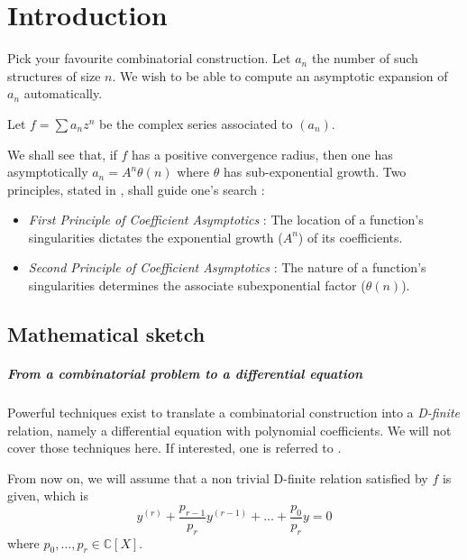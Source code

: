 \documentclass[../main.tex]{subfiles}
\begin{document}
\chapter{Introduction}


Pick your favourite combinatorial construction. Let $a_n$ the number of such structures of size $n$. We wish to be able to compute an asymptotic expansion of $a_n$ automatically.

Let $f = \sum a_n z^n$ be the complex series associated to $(a_n)$.

We shall see that, if $f$ has a positive convergence radius, then one has asymptotically $a_n = A^n \theta(n)$ where $\theta$ has sub-exponential growth.
Two principles, stated in \cite{Flajolet2009}, shall guide one's search :

\begin{itemize}
	\item	\emph{First Principle of Coefficient Asymptotics} : The location of a function’s
			singularities dictates the exponential growth ($A^n$) of its coefficients.
	
	\item	\emph{Second Principle of Coefficient Asymptotics} : The nature of a function’s
			singularities determines the associate subexponential factor ($\theta(n)$).
	
\end{itemize}

\section{Mathematical sketch}

\paragraph{From a combinatorial problem to a differential equation}
Powerful techniques exist to translate a combinatorial construction into a \emph{D-finite} relation, namely a differential equation with polynomial coefficients.
We will not cover those techniques here. If interested, one is referred to \cite{Flajolet2009}.

From now on, we will assume that a non trivial D-finite relation satisfied by $f$ is given, which is 
\begin{equation}\label{basic_eq_diff}
y^{(r)} + \frac{p_{r-1}}{p_r} y^{(r - 1)} + \dots + \frac{p_0}{p_r} y = 0
\end{equation}
where $p_0, \dots, p_r \in \mathbb{C}[X]$.
\end{document}

